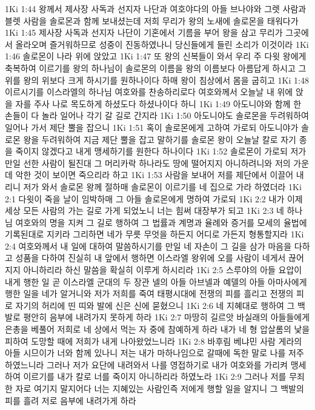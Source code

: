 1Ki 1:44  왕께서 제사장 사독과 선지자 나단과 여호야다의 아들 브나야와 그렛 사람과 블렛 사람을 솔로몬과 함께 보내셨는데 저희 무리가 왕의 노새에 솔로몬을 태워다가
1Ki 1:45  제사장 사독과 선지자 나단이 기혼에서 기름을 부어 왕을 삼고 무리가 그곳에서 올라오며 즐거워하므로 성중이 진동하였나니 당신들에게 들린 소리가 이것이라
1Ki 1:46  솔로몬이 나라 위에 앉았고
1Ki 1:47  또 왕의 신복들이 와서 우리 주 다윗 왕에게 축복하여 이르기를 왕의 하나님이 솔로몬의 이름을 왕의 이름보다 아름답게 하시고 그 위를 왕의 위보다 크게 하시기를 원하나이다 하매 왕이 침상에서 몸을 굽히고
1Ki 1:48  이르시기를 이스라엘의 하나님 여호와를 찬송하리로다 여호와께서 오늘날 내 위에 앉을 자를 주사 나로 목도하게 하셨도다 하셨나이다 하니
1Ki 1:49  아도니야와 함께 한 손들이 다 놀라 일어나 각기 갈 길로 간지라
1Ki 1:50  아도니야도 솔로몬을 두려워하여 일어나 가서 제단 뿔을 잡으니
1Ki 1:51  혹이 솔로몬에게 고하여 가로되 아도니야가 솔로몬 왕을 두려워하여 지금 제단 뿔을 잡고 말하기를 솔로몬 왕이 오늘날 칼로 자기 종을 죽이지 않겠다고 내게 맹세하기를 원한다 하나이다
1Ki 1:52  솔로몬이 가로되 저가 만일 선한 사람이 될진대 그 머리카락 하나라도 땅에 떨어지지 아니하려니와 저의 가운데 악한 것이 보이면 죽으리라 하고
1Ki 1:53  사람을 보내어 저를 제단에서 이끌어 내리니 저가 와서 솔로몬 왕께 절하매 솔로몬이 이르기를 네 집으로 가라 하였더라
1Ki 2:1  다윗이 죽을 날이 임박하매 그 아들 솔로몬에게 명하여 가로되
1Ki 2:2  내가 이제 세상 모든 사람의 가는 길로 가게 되었노니 너는 힘써 대장부가 되고
1Ki 2:3  네 하나님 여호와의 명을 지켜 그 길로 행하여 그 법률과 계명과 율례와 증거를 모세의 율법에 기록된대로 지키라 그리하면 네가 무릇 무엇을 하든지 어디로 가든지 형통할지라
1Ki 2:4  여호와께서 내 일에 대하여 말씀하시기를 만일 네 자손이 그 길을 삼가 마음을 다하고 성품을 다하여 진실히 내 앞에서 행하면 이스라엘 왕위에 오를 사람이 네게서 끊어지지 아니하리라 하신 말씀을 확실히 이루게 하시리라
1Ki 2:5  스루야의 아들 요압이 내게 행한 일 곧 이스라엘 군대의 두 장관 넬의 아들 아브넬과 예델의 아들 아마사에게 행한 일을 네가 알거니와 저가 저희를 죽여 태평시대에 전쟁의 피를 흘리고 전쟁의 피로 자기의 허리에 띤 띠와 발에 신은 신에 묻혔으니
1Ki 2:6  네 지혜대로 행하여 그 백발로 평안히 음부에 내려가지 못하게 하라
1Ki 2:7  마땅히 길르앗 바실래의 아들들에게 은총을 베풀어 저희로 네 상에서 먹는 자 중에 참예하게 하라 내가 네 형 압살롬의 낯을 피하여 도망할 때에 저희가 내게 나아왔었느니라
1Ki 2:8  바후림 베냐민 사람 게라의 아들 시므이가 너와 함께 있나니 저는 내가 마하나임으로 갈때에 독한 말로 나를 저주하였느니라 그러나 저가 요단에 내려와서 나를 영접하기로 내가 여호와를 가리켜 맹세하여 이르기를 내가 칼로 너를 죽이지 아니하리라 하였노라
1Ki 2:9  그러나 저를 무죄한 자로 여기지 말지어다 너는 지혜있는 사람인즉 저에게 행할 일을 알지니 그 백발의 피를 흘려 저로 음부에 내려가게 하라
